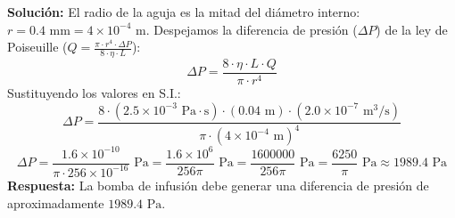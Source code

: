 \documentclass[12pt,letterpaper]{article}
\begin{document}
\begin{enumerate}
    \textbf{Solución:}
    El radio de la aguja es la mitad del diámetro interno: $r = 0.4 \text{ mm} = 4 \times 10^{-4} \text{ m}$.
    Despejamos la diferencia de presión ($\Delta P$) de la ley de Poiseuille ($Q = \frac{\pi \cdot r^4 \cdot \Delta P}{8 \cdot \eta \cdot L}$):
    \[
    \Delta P = \frac{8 \cdot \eta \cdot L \cdot Q}{\pi \cdot r^4}
    \]
    Sustituyendo los valores en S.I.:
    \[
    \Delta P = \frac{8 \cdot (2.5 \times 10^{-3} \text{ Pa}\cdot\text{s}) \cdot (0.04 \text{ m}) \cdot (2.0 \times 10^{-7} \text{ m}^3\text{/s})}{\pi \cdot (4 \times 10^{-4} \text{ m})^4}
    \]
    \[
    \Delta P = \frac{1.6 \times 10^{-10}}{\pi \cdot 256 \times 10^{-16}} \text{ Pa} = \frac{1.6 \times 10^6}{256\pi} \text{ Pa} = \frac{1600000}{256\pi} \text{ Pa} = \frac{6250}{\pi} \text{ Pa} \approx 1989.4 \text{ Pa}
    \]
    \textbf{Respuesta:} La bomba de infusión debe generar una diferencia de presión de aproximadamente $1989.4 \text{ Pa}$.

\end{enumerate}
\end{document}
